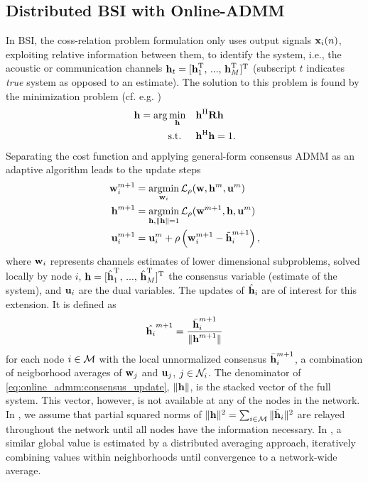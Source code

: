 \documentclass{article}
\begin{document}
\subsection[]{Distributed BSI with Online-ADMM}
In BSI, the coss-relation problem formulation only uses output signals \(\bm{\mathrm{x}}_i(n)\), exploiting relative information between them, to identify the system, i.e., the acoustic or communication channels \(\bm{\mathrm{h}}_t = [\bm{\mathrm{h}}_1^{\mathrm{T}},\,...,\,\bm{\mathrm{h}}_M^{\mathrm{T}}]^{\mathrm{T}}\) (subscript \(t\) indicates \emph{true} system as opposed to an estimate).
The solution to this problem is found by the minimization problem (cf. e.g. \cite{langtongBlindIdentificationEqualization1994,huangAdaptiveMultichannelLeast2002,huangClassFrequencydomainAdaptive2003,blochbergerDBSI})
\begin{equation}
    \begin{aligned}
        \bm{\mathrm{h}} = \arg \min_{\bm{\mathrm{h}}} \quad &\bm{\mathrm{h}}^{\mathrm{H}} \bm{\mathrm{R}} \bm{\mathrm{h}} \\
        \text{s.t. } \quad &\bm{\mathrm{h}}^{\mathrm{H}} \bm{\mathrm{h}} = 1.
    \end{aligned}\label{eq:frequency_domain:min_prob}
\end{equation}
Separating the cost function and applying general-form consensus ADMM as an adaptive algorithm leads to the update steps
\begin{align}
    \bm{\mathrm{w}}_i^{m+1} &= \underset{\bm{\mathrm{w}}_i}{\operatorname{argmin}} \, \mathcal{L}_{\rho} (\bm{\mathrm{w}},\bm{\mathrm{h}}^m,\bm{\mathrm{u}}^m)\label{eq:general_consensus_admm:local}\\
    \bm{\mathrm{h}}^{m+1} &= \underset{\bm{\mathrm{h}}, \|\bm{\mathrm{h}}\| = 1}{\operatorname{argmin}}\, \mathcal{L}_{\rho} (\bm{\mathrm{w}}^{m+1},\bm{\mathrm{h}},\bm{\mathrm{u}}^m)\label{eq:general_consensus_admm:global}\\
    \bm{\mathrm{u}}_i^{m+1} &= \bm{\mathrm{u}}_i^{m} + \rho \left( \bm{\mathrm{w}}_i^{m+1} - \tilde{\bm{\mathrm{h}}}_i^{m+1} \right),\label{eq:general_consensus_admm:dual}
\end{align}
where \(\bm{\mathrm{w}}_i\) represents channels estimates of lower dimensional subproblems, solved locally by node \(i\), \(\bm{\mathrm{h}} = [\hat{\bm{\mathrm{h}}}_1^{\mathrm{T}},\,...,\,\hat{\bm{\mathrm{h}}}_M^{\mathrm{T}}]^{\mathrm{T}}\) the consensus variable (estimate of the system), and \(\bm{\mathrm{u}}_i\) are the dual variables.
The updates of \(\hat{\bm{\mathrm{h}}}_i\) are of interest for this extension.
It is defined \cite{blochbergerDBSI} as
\begin{equation}
    \hat{\bm{\mathrm{h}}_i}^{m+1} = \frac{\bar{\bm{\mathrm{h}}}_i^{m+1}}{\|\bm{\mathrm{h}}^{m+1}\|}\label{eq:online_admm:consensus_update}
\end{equation}
for each node \(i \in \mathcal{M}\) with the local unnormalized consensus \(\bar{\bm{\mathrm{h}}}_i^{m+1}\), a combination of neigborhood averages of \(\bm{\mathrm{w}}_j\) and \(\bm{\mathrm{u}}_j\), \(j \in \mathcal{N}_i\).
The denominator of \eqref{eq:online_admm:consensus_update}, \(\|\bm{\mathrm{h}}\|\), is the stacked vector of the full system. This vector, however, is not available at any of the nodes in the network.
In \cite{blochbergerDBSI}, we assume that partial squared norms of \(\|\bm{\mathrm{h}}\|^2 = \sum_{i \in \mathcal{M}} \|\bar{\bm{\mathrm{h}}}_i\|^2\) are relayed throughout the network until all nodes have the information necessary.
In \cite{yuDistributedBlindSystem2014,liuDistributedBlindIdentification2016}, a similar global value is estimated by a distributed averaging approach, iteratively combining values within neighborhoods until convergence to a network-wide average.
\end{document}
